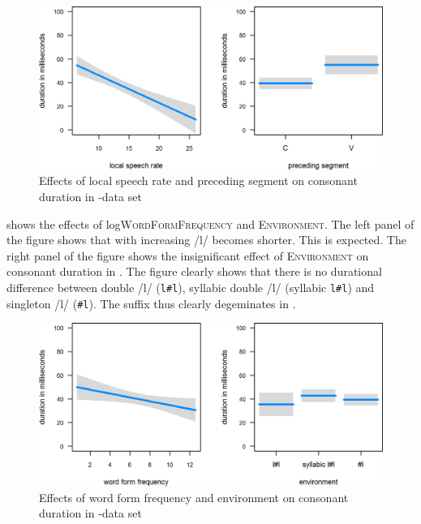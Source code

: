 \begin{figure}
	
		
	\includegraphics[scale=.8] {images/Corpus/lyModelcov.png}
	\caption{Effects of local speech rate and preceding segment on consonant duration in -data set}
	\label{fig:corpus covariates ly}
\end{figure}





 shows the effects of log\textsc{WordFormFrequency} and \textsc{Environment}.
The left panel of the figure shows that with increasing  /l/ becomes shorter. This is expected.
The right panel of the figure shows the insignificant effect of \textsc{Environment} on consonant duration in . The figure clearly shows that there is no durational difference between double /l/ (\texttt{l\#l}), syllabic double /l/ (syllabic \texttt{l\#l}) and singleton /l/ (\texttt{\#l}). The suffix  thus clearly degeminates in . 


\begin{figure}
	

	\includegraphics[scale=.8] {images/Corpus/lyModelTransitionTypeAndFreq.png}
	\caption{Effects of word form frequency  and environment on consonant duration in -data set}
	\label{fig:corpus main effects  ly}
\end{figure}





